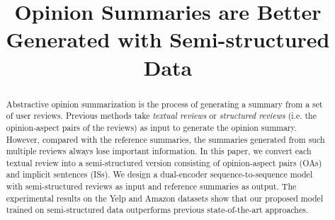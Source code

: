 \documentclass[sigconf]{acmart}
\begin{document}
\title{Opinion Summaries are Better Generated with Semi-structured Data}




\begin{abstract}
Abstractive opinion summarization is the process of 
generating a summary from a set of user reviews.
Previous methods take \textit{textual reviews} or 
\textit{structured reviews} (i.e. the opinion-aspect pairs of the reviews)
as input to generate the opinion summary. 
However, compared with the reference summaries, the summaries generated from such multiple reviews always 
lose important information.
In this paper, 
we convert each textual review into a semi-structured
version consisting of 
opinion-aspect pairs (OAs) and implicit sentences (ISs).
We design a dual-encoder sequence-to-sequence model with semi-structured reviews as input and reference summaries as output.
The experimental results on the Yelp and Amazon datasets 
show that our proposed model trained on semi-structured data outperforms previous state-of-the-art approaches.
\end{abstract}

%
%
\end{document}
